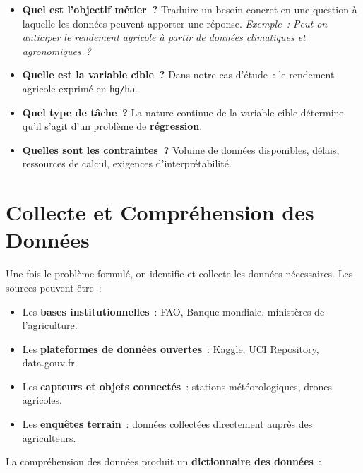 \begin{itemize}[leftmargin=1.5cm, itemsep=4pt]
  \item \textbf{Quel est l'objectif métier~?} Traduire un besoin concret en une question à laquelle les données peuvent apporter une réponse. \textit{Exemple~: Peut-on anticiper le rendement agricole à partir de données climatiques et agronomiques~?}
  \item \textbf{Quelle est la variable cible~?} Dans notre cas d'étude~: le rendement agricole exprimé en \texttt{hg/ha}.
  \item \textbf{Quel type de tâche~?} La nature continue de la variable cible détermine qu'il s'agit d'un problème de \textbf{régression}.
  \item \textbf{Quelles sont les contraintes~?} Volume de données disponibles, délais, ressources de calcul, exigences d'interprétabilité.
\end{itemize}

\section{Collecte et Compréhension des Données}

Une fois le problème formulé, on identifie et collecte les données nécessaires. Les sources peuvent être~:

\begin{itemize}[leftmargin=1.5cm, itemsep=3pt]
  \item Les \textbf{bases institutionnelles}~: FAO, Banque mondiale, ministères de l'agriculture.
  \item Les \textbf{plateformes de données ouvertes}~: Kaggle, UCI Repository, data.gouv.fr.
  \item Les \textbf{capteurs et objets connectés}~: stations météorologiques, drones agricoles.
  \item Les \textbf{enquêtes terrain}~: données collectées directement auprès des agriculteurs.
\end{itemize}

La compréhension des données produit un \textbf{dictionnaire des données}~:

